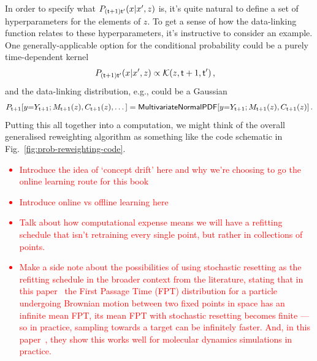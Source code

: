 In order to specify what $P_{({\sf t}+1){\sf t}'}(x\vert x',z)$ is, it's quite natural to define a set of hyperparameters for the elements of $z$. To get a sense of how the data-linking function relates to these hyperparameters, it's instructive to consider an example. One generally-applicable option for the conditional probability could be a purely time-dependent kernel
\begin{align}
P_{({\sf t}+1){\sf t}'}(x\vert x',z) &\propto {\cal K}(z, {\sf t}+1,{\sf t}')  \label{eq:time-dependent-kernel} \,, 
\end{align}
and the data-linking distribution, e.g., could be a Gaussian
\begin{align}
P_{{\sf t}+1}[y{=}Y_{{\sf t}+1};M_{{\sf t}+1}(z),C_{{\sf t}+1}(z),\dots ] = {\sf MultivariateNormalPDF}[y{=}Y_{{\sf t}+1};M_{{\sf t}+1}(z),C_{{\sf t}+1}(z)] \label{eq:gaussian-data-prob}\,.
\end{align}
Putting this all together into a computation, we might think of the overall generalised reweighting algorithm as something like the code schematic in Fig.~\ref{fig:prob-reweighting-code}.

\textcolor{red}{
\begin{itemize}
\item{Introduce the idea of `concept drift' here and why we're choosing to go the online learning route for this book}
\item{Introduce online vs offline learning here}
\item{Talk about how computational expense means we will have a refitting schedule that isn't retraining every single point, but rather in collections of points.} 
\item{Make a side note about the possibilities of using stochastic resetting as the refitting schedule in the broader context from the literature, stating that in this paper~\cite{evans2011diffusion} the First Passage Time (FPT) distribution for a particle undergoing Brownian motion between two fixed points in space has an infinite mean FPT, its mean FPT with stochastic resetting becomes finite --- so in practice, sampling towards a target can be infinitely faster. And, in this paper~\cite{blumer2022stochastic}, they show this works well for molecular dynamics simulations in practice. }
\end{itemize}
}

